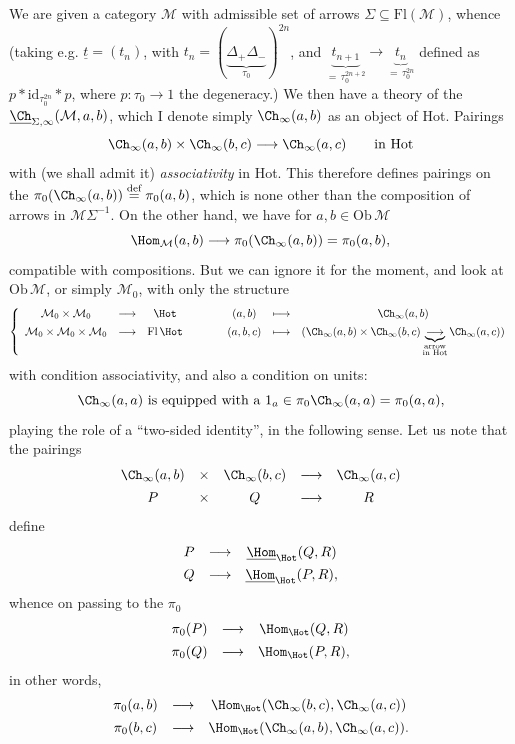 We are given a category $\mathcal{M}$ with admissible set of arrows $\Sigma \subseteq \mathrm{Fl}(\mathcal{M})$, whence (taking e.g. $\underline{t} = (t_n)$, with $t_n = (\underbrace{\Delta_+\Delta_-}_{\tau_0})^{2n}$, and $\underbrace{t_{n+1}}_{=\,\tau_0^{2n+2}} \longrightarrow \underbrace{t_n}_{=\,\tau_0^{2n}}$ defined as $p * \mathrm{id}_{\tau_0^{2n}} * p$, where $p : \tau_0 \longrightarrow 1$ the degeneracy.) We then have a theory of the $\underline{\Ch}_{\Sigma,\infty}(\mathcal{M},a,b)$, which I denote simply $\Ch_\infty(a,b)$ as an object of Hot. Pairings
\[
\Ch_\infty(a,b) \times \Ch_\infty(b,c) \longrightarrow \Ch_\infty(a,c) \qquad \text{in Hot}
\]
with (we shall admit it) \textit{associativity} in Hot. This therefore defines pairings on the $\pi_0(\Ch_\infty(a,b)) \overset{\text{def}}{=} \pi_0(a,b)$, which is none other than the composition of arrows in $\mathcal{M}\Sigma^{-1}$. On the other hand, we have for $a,b \in \mathrm{Ob}\,\mathcal{M}$
\[
\Hom_{\mathcal{M}}(a,b) \longrightarrow \pi_0(\Ch_\infty(a,b)) = \pi_0(a,b),
\]
compatible with compositions. But we can ignore it for the moment, and look at $\mathrm{Ob}\,\mathcal{M}$, or simply $\mathcal{M}_0$, with only the structure
\[
\left\{
\begin{array}{ccccccc}
\mathcal{M}_0 \times \mathcal{M}_0 & \longrightarrow & \Hot & \qquad & (a,b) & \longmapsto & \Ch_\infty(a,b) \\[1ex]
\mathcal{M}_0 \times \mathcal{M}_0 \times \mathcal{M}_0 & \longrightarrow & \mathrm{Fl}\,\Hot & \qquad & (a,b,c) & \longmapsto & (\Ch_\infty(a,b) \times \Ch_\infty(b,c) \underbrace{\longrightarrow}_{\substack{\text{arrow}\\ \text{in Hot}}} \Ch_\infty(a,c))
\end{array}
\right.
\]
with condition associativity, and also a condition on units:
\[
\Ch_\infty(a,a) \text{ is equipped with a } 1_a \in \pi_0\Ch_\infty(a,a) = \pi_0(a,a),
\]
playing the role of a ``two-sided identity'', in the following sense. Let us note that the pairings
\[
\begin{array}{ccccc}
\Ch_\infty(a,b) & \times & \Ch_\infty(b,c) & \longrightarrow & \Ch_\infty(a,c) \\[1ex]
P & \times & Q & \longrightarrow & R
\end{array}
\]
define
\[
\begin{array}{ccc}
P & \longrightarrow & \underline{\Hom}_{\Hot}(Q,R) \\[1ex]
Q & \longrightarrow & \underline{\Hom}_{\Hot}(P,R),
\end{array}
\]
whence on passing to the $\pi_0$
\[
\begin{array}{ccc}
\pi_0(P) & \longrightarrow & \Hom_{\Hot}(Q,R) \\[1ex]
\pi_0(Q) & \longrightarrow & \Hom_{\Hot}(P,R),
\end{array}
\]
in other words,
\[
\begin{array}{ccc}
\pi_0(a,b) & \longrightarrow & \Hom_{\Hot}(\Ch_\infty(b,c),\Ch_\infty(a,c)) \\[1ex]
\pi_0(b,c) & \longrightarrow & \Hom_{\Hot}(\Ch_\infty(a,b),\Ch_\infty(a,c)).
\end{array}
\]

